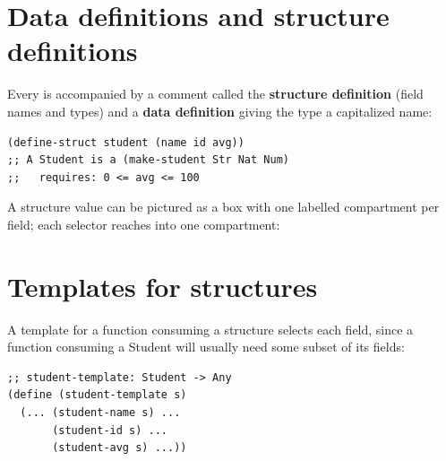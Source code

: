 \section{Data definitions and structure definitions}

Every  is accompanied by a comment called the
\textbf{structure definition} (field names and types) and a \textbf{data
definition} giving the type a capitalized name:

\begin{lstlisting}[style=racket]
(define-struct student (name id avg))
;; A Student is a (make-student Str Nat Num)
;;   requires: 0 <= avg <= 100
\end{lstlisting}

A structure value can be pictured as a box with one labelled compartment per
field; each selector reaches into one compartment:

\begin{center}
\end{center}

\section{Templates for structures}

A template for a function consuming a structure selects each field, since a
function consuming a Student will usually need some subset of its fields:

\begin{lstlisting}[style=racket]
;; student-template: Student -> Any
(define (student-template s)
  (... (student-name s) ...
       (student-id s) ...
       (student-avg s) ...))
\end{lstlisting}


